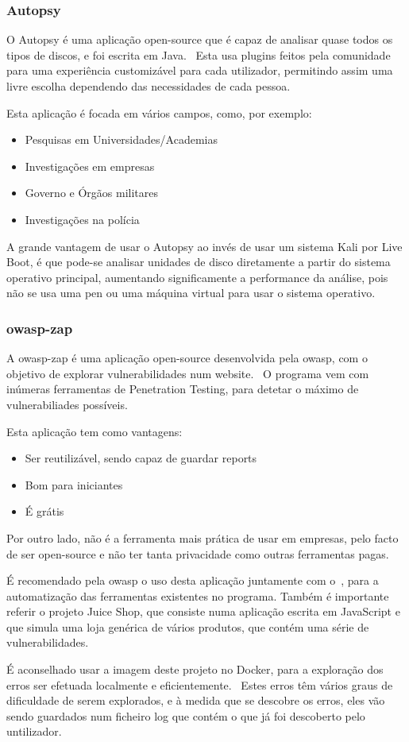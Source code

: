 \documentclass{report}
\begin{document}
\subsubsection{Autopsy}
\label{subsubsec:autopsy}
O Autopsy é uma aplicação open-source que é capaz de analisar quase todos os tipos de discos, e foi escrita em Java. \ Esta usa plugins feitos pela comunidade para uma experiência customizável para cada utilizador, permitindo assim uma livre escolha dependendo das necessidades de cada pessoa. \par
Esta aplicação é focada em vários campos, como, por exemplo:
\begin{itemize}
    \item Pesquisas em Universidades/Academias
    \item Investigações em empresas
    \item Governo e Órgãos militares
    \item Investigações na polícia
\end{itemize}
A grande vantagem de usar o Autopsy ao invés de usar um sistema Kali por Live Boot, é que pode-se analisar unidades de disco diretamente a partir do sistema operativo principal, aumentando significamente a performance da análise, pois não se usa uma pen ou uma máquina virtual para usar o sistema operativo.


\subsubsection{\ac{owasp-zap}}
\label{subsubsec:owasp-zap}
A \ac{owasp-zap} é uma aplicação open-source desenvolvida pela \ac{owasp}, com o objetivo de explorar vulnerabilidades num website. \ O programa vem com inúmeras ferramentas de Penetration Testing, para detetar o máximo de vulnerabiliades possíveis. \par
Esta aplicação tem como vantagens:
\begin{itemize}
    \item Ser reutilizável, sendo capaz de guardar reports
    \item Bom para iniciantes
    \item É grátis
\end{itemize}
Por outro lado, não é a ferramenta mais prática de usar em empresas, pelo facto de ser open-source e não ter tanta privacidade como outras ferramentas pagas. \par
É recomendado pela \ac{owasp} o uso desta aplicação juntamente com o~, para a automatização das ferramentas existentes no programa. \bigskip
Também é importante referir o projeto Juice Shop, que consiste numa aplicação escrita em JavaScript e que simula uma loja genérica de vários produtos, que contém uma série de vulnerabilidades. \par
É aconselhado usar a imagem deste projeto no Docker, para a exploração dos erros ser efetuada localmente e eficientemente. \ Estes erros têm vários graus de dificuldade de serem explorados, e à medida que se descobre os erros, eles vão sendo guardados num ficheiro log que contém o que já foi descoberto pelo untilizador.
\end{document}
